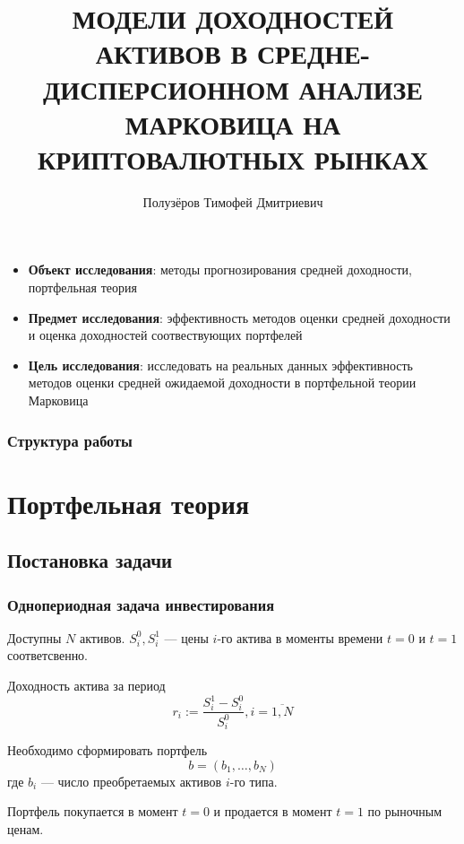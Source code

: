 \documentclass{beamer}
\title[]{МОДЕЛИ ДОХОДНОСТЕЙ АКТИВОВ В СРЕДНЕ-ДИСПЕРСИОННОМ АНАЛИЗЕ МАРКОВИЦА НА КРИПТОВАЛЮТНЫХ РЫНКАХ}
\subtitle{}
\author[Полузёров Т. Д.]{Полузёров Тимофей Дмитриевич}
\institute[]{Научный руководитель Харин Алексей Юрьевич}
\date{}
\begin{document}
\begin{frame}
    \titlepage
\end{frame}

\begin{frame}
    \begin{itemize}
        \item \textbf{Объект исследования}: методы прогнозирования средней доходности, портфельная теория
        
        \item \textbf{Предмет исследования}: эффективность методов оценки средней доходности и 
        оценка доходностей соотвествующих портфелей
        
        \item \textbf{Цель исследования}: исследовать на реальных данных эффективность методов
        оценки средней ожидаемой доходности в портфельной теории Марковица
    \end{itemize}
\end{frame}

\begin{frame}
    \begin{center}
        \frametitle{Структура работы}
        \tableofcontents
    \end{center}
\end{frame}

\section{Портфельная теория}

\subsection{Постановка задачи}

\begin{frame}
    \frametitle{Однопериодная задача инвестирования}
    Доступны $N$ активов.
    $S_i^0, S_i^1$ --- цены $i$-го актива в моменты времени $t=0$ и
    $t=1$ соответсвенно.

    Доходность актива за период
    \[
        r_i := \frac{S_i^1 - S_i^0}{S_i^0}, i=\overline{1, N}
    \]

    Необходимо сформировать портфель
    \[
        b = (b_1, \dots, b_N)
    \]
    где $b_i$ --- число преобретаемых активов $i$-го типа.

    Портфель покупается в момент $t=0$ и продается в момент $t=1$ по рыночным ценам.
\end{frame}
\end{document}
